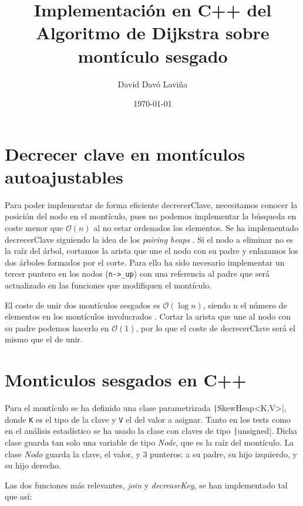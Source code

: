 \documentclass{article}
\title{Implementación en C++ del Algoritmo de Dijkstra sobre montículo sesgado}
\author{David Davó Laviña}
\date{\today{}}
\begin{document}
\section{Decrecer clave en montículos autoajustables}
Para poder implementar de forma eficiente decrecerClave, necesitamos conocer la
posición del nodo en el montículo, pues no podemos implementar la búsqueda en coste
menor que $\mathcal{O}(n)$ al no estar ordenados los elementos. Se ha implementado
decrecerClave siguiendo la idea de los \textit{pairing heaps} \cite{PairingHeap}. Si el nodo
a eliminar no es la raíz del árbol, cortamos la arista que une el nodo con su padre y
enlazamos los dos árboles formados por el corte. Para ello ha sido necesario
implementar un tercer puntero en los nodos (\texttt{n->\_up}) con una referencia al padre
que será actualizado en las funciones que modifiquen el montículo.

El coste de unir dos montículos sesgados es $\mathcal{O}(\log n)$, siendo n el número de elementos en los montículos involucrados \cite{SkewHeap}. Cortar la arista que une al nodo con su padre podemos hacerlo en $\mathcal{O}(1)$, por lo que el coste de decrecerClave será el mismo que el de unir. 

\section{Monticulos sesgados en C++}
Para el montículo se ha definido una clase parametrizada \texttt|SkewHeap<K,V>|, donde \texttt{K} es el tipo de la clave y \texttt{V} el del valor a asignar. Tanto en los tests como en el análisis estadístico se ha usado la clase con claves de tipo \texttt|unsigned|. Dicha clase guarda tan solo una variable de tipo \textit{Node}, que es la raíz del montículo. La clase \textit{Nodo} guarda la clave, el valor, y 3 punteros: a su padre, su hijo izquierdo, y su hijo derecho.

Las dos funciones más relevantes, \textit{join} y \textit{decreaseKey}, se han implementado tal que así:
\end{document}
